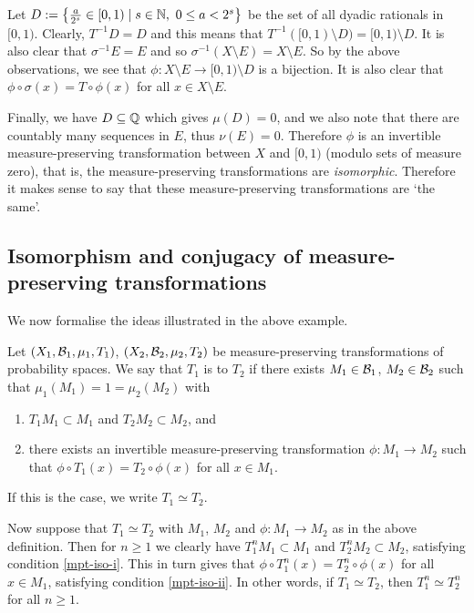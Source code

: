Let $D := \left\{\frac{a}{2^s} \in [0, 1) \mid s \in \mathbb{N},\ 0 \leq a < 2^s\right\}$ be the set of all dyadic rationals in $[0, 1)$. Clearly, $T^{-1}D = D$ and this means that $T^{-1}([0, 1) \setminus D) = [0, 1) \setminus D$. It is also clear that $\sigma^{-1}E = E$ and so $\sigma^{-1}(X \setminus E) = X \setminus E$. So by the above observations, we see that $\phi: X \setminus E \to [0, 1) \setminus D$ is a bijection. It is also clear that $\phi \circ \sigma(x) = T \circ \phi(x)$ for all $x \in X \setminus E$.

Finally, we have $D \subseteq \mathbb{Q}$ which gives $\mu(D) = 0$, and we also note that there are countably many sequences in $E$, thus $\nu(E) = 0$. Therefore $\phi$ is an invertible measure-preserving transformation between $X$ and $[0, 1)$ (modulo sets of measure zero), that is, the measure-preserving transformations are \emph{isomorphic}. Therefore it makes sense to say that these measure-preserving transformations are `the same'.

\subsection{\texorpdfstring{\sloppy Isomorphism and conjugacy of measure-preserving transformations}{Isomorphism and conjugacy of measure-preserving transformations}}
We now formalise the ideas illustrated in the above example.

\begin{definition}
	\sloppy Let $(X_1, \mathcal{B}_1, \mu_1, T_1)$, $(X_2, \mathcal{B}_2, \mu_2, T_2)$ be measure-preserving transformations of probability spaces. We say that $T_1$ is  to $T_2$ if there exists $M_1 \in \mathcal{B}_1$, $M_2 \in \mathcal{B}_2$ such that $\mu_1(M_1) = 1 = \mu_2(M_2)$ with
	\begin{enumerate}
		\item $T_1{M_1} \subset M_1$ and $T_2{M_2} \subset M_2$, and \label{mpt-iso-i}
		\item there exists an invertible measure-preserving transformation $\phi : M_1 \to M_2$ such that $\phi \circ T_1(x) = T_2 \circ \phi(x)$ for all $x \in M_1$. \label{mpt-iso-ii}
	\end{enumerate}
	If this is the case, we write $T_1 \simeq T_2$.
\end{definition}

Now suppose that $T_1 \simeq T_2$ with $M_1$, $M_2$ and $\phi : M_1 \to M_2$ as in the above definition. Then for $n \geq 1$ we clearly have $T_1^n{M_1} \subset M_1$ and $T_2^n{M_2} \subset M_2$, satisfying condition \ref{mpt-iso-i}. This in turn gives that $\phi \circ T_1^n(x) = T_2^n \circ \phi(x)$ for all $x \in M_1$, satisfying condition \ref{mpt-iso-ii}. In other words, if $T_1 \simeq T_2$, then $T_1^n \simeq T_2^n$ for all $n \geq 1$.

